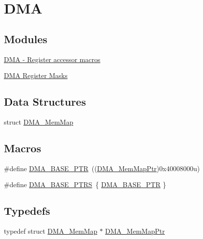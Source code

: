 \hypertarget{group___d_m_a___peripheral}{}\section{D\+MA}
\label{group___d_m_a___peripheral}
\subsection*{Modules}
\begin{DoxyCompactItemize}
\item 
\hyperlink{group___d_m_a___register___accessor___macros}{D\+M\+A -\/ Register accessor macros}
\item 
\hyperlink{group___d_m_a___register___masks}{D\+M\+A Register Masks}
\end{DoxyCompactItemize}
\subsection*{Data Structures}
\begin{DoxyCompactItemize}
\item 
struct \hyperlink{struct_d_m_a___mem_map}{D\+M\+A\+\_\+\+Mem\+Map}
\end{DoxyCompactItemize}
\subsection*{Macros}
\begin{DoxyCompactItemize}
\item 
\#define \hyperlink{group___d_m_a___peripheral_ga6997fbc1b1973e9f27170217a3bd6f22}{D\+M\+A\+\_\+\+B\+A\+S\+E\+\_\+\+P\+TR}~((\hyperlink{group___d_m_a___peripheral_ga160c27c95a39a9791079b32fe7e843a1}{D\+M\+A\+\_\+\+Mem\+Map\+Ptr})0x40008000u)
\item 
\#define \hyperlink{group___d_m_a___peripheral_gada914e90165e25ae4eeddf5175920e77}{D\+M\+A\+\_\+\+B\+A\+S\+E\+\_\+\+P\+T\+RS}~\{ \hyperlink{group___d_m_a___peripheral_ga6997fbc1b1973e9f27170217a3bd6f22}{D\+M\+A\+\_\+\+B\+A\+S\+E\+\_\+\+P\+TR} \}
\end{DoxyCompactItemize}
\subsection*{Typedefs}
\begin{DoxyCompactItemize}
\item 
typedef struct \hyperlink{struct_d_m_a___mem_map}{D\+M\+A\+\_\+\+Mem\+Map} $\ast$ \hyperlink{group___d_m_a___peripheral_ga160c27c95a39a9791079b32fe7e843a1}{D\+M\+A\+\_\+\+Mem\+Map\+Ptr}
\end{DoxyCompactItemize}


